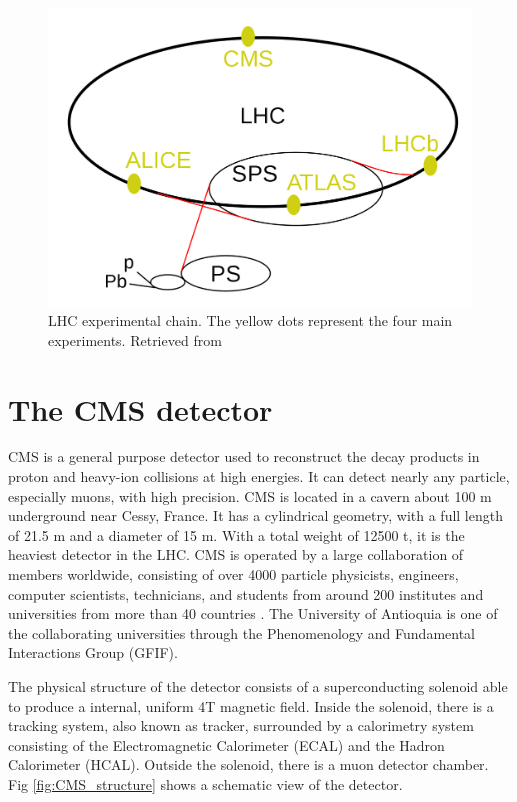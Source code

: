 \begin{figure}[htp!]
	\centering
	\includegraphics[scale=0.3]{MainContent/Figs/LHC.png}
	\caption{LHC experimental chain. The yellow dots represent the four main experiments. Retrieved from }
	\label{fig:LHC}
\end{figure}

\section{The CMS detector}

CMS is a general purpose detector used to reconstruct the decay products in proton and heavy-ion collisions at high energies. It can detect nearly any particle, especially muons, with high precision. CMS is located in a cavern about 100 m underground near Cessy, France. It has a cylindrical geometry, with a full length of 21.5 m and a diameter of 15 m. With a total weight of 12500 t, it is the heaviest detector in the LHC. CMS is operated by a large collaboration of members worldwide, consisting of over 4000 particle physicists, engineers, computer scientists, technicians, and students from around 200 institutes and universities from more than 40 countries \cite{cms_collab}. The University of Antioquia is one of the collaborating universities through the Phenomenology and Fundamental Interactions Group (GFIF).

The physical structure of the detector consists of a superconducting solenoid able to produce a internal, uniform 4T magnetic field. Inside the solenoid, there is a tracking system, also known as tracker, surrounded by a calorimetry system consisting of the Electromagnetic Calorimeter (ECAL) and the Hadron Calorimeter (HCAL). Outside the solenoid, there is a muon detector chamber. Fig \ref{fig:CMS_structure}  shows a schematic view of the detector.

